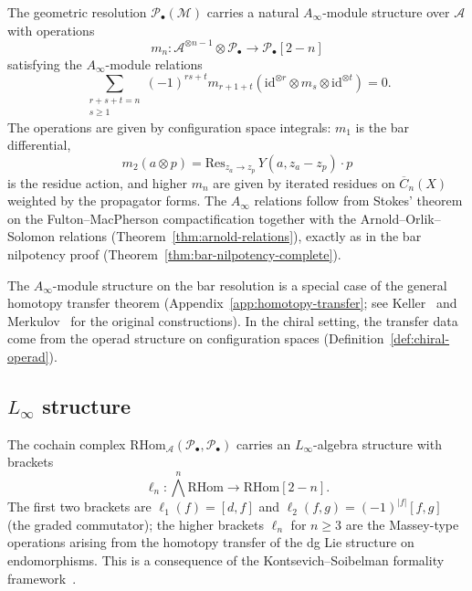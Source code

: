 \begin{theorem}\label{thm:ainfty-module}
The geometric resolution $\mathcal{P}_\bullet(\mathcal{M})$ carries a
natural $A_\infty$-module structure over $\mathcal{A}$ with operations
\[
m_n: \mathcal{A}^{\otimes n-1} \otimes \mathcal{P}_\bullet
\to \mathcal{P}_\bullet[2-n]
\]
satisfying the $A_\infty$-module relations
\[
\sum_{\substack{r+s+t=n \\ s \geq 1}} (-1)^{rs+t}
m_{r+1+t}(\mathrm{id}^{\otimes r} \otimes m_s \otimes \mathrm{id}^{\otimes t}) = 0.
\]
The operations are given by configuration space integrals:
$m_1$ is the bar differential,
\[
m_2(a \otimes p) =
\mathrm{Res}_{z_a \to z_p}\, Y(a, z_a{-}z_p) \cdot p
\]
is the residue action, and higher $m_n$ are given by
iterated residues on $\overline{C}_n(X)$ weighted by the
propagator forms. The $A_\infty$ relations follow from
Stokes' theorem on the Fulton--MacPherson compactification
together with the Arnold--Orlik--Solomon relations
(Theorem~\ref{thm:arnold-relations}), exactly as in the
bar nilpotency proof (Theorem~\ref{thm:bar-nilpotency-complete}).
\end{theorem}

\begin{remark}
The $A_\infty$-module structure on the bar resolution is a special case
of the general homotopy transfer theorem
(Appendix~\ref{app:homotopy-transfer}; see
Keller~\cite{Keller01} and Merkulov~\cite{Merkulov99} for the
original constructions). In the chiral setting, the transfer
data come from the operad structure on configuration spaces
(Definition~\ref{def:chiral-operad}).
\end{remark}

\subsection{\texorpdfstring{$L_\infty$ structure}{L-infinity structure}}

\begin{theorem}\label{thm:linfty-cochains}
The cochain complex $\mathrm{RHom}_{\mathcal{A}}(\mathcal{P}_\bullet,
\mathcal{P}_\bullet)$ carries an $L_\infty$-algebra structure with brackets
\[
\ell_n: \textstyle\bigwedge^n \mathrm{RHom} \to \mathrm{RHom}[2-n].
\]
The first two brackets are $\ell_1(f) = [d, f]$ and
$\ell_2(f, g) = (-1)^{|f|}[f, g]$ (the graded commutator);
the higher brackets $\ell_n$ for $n \geq 3$ are
the Massey-type operations arising from the homotopy
transfer of the dg Lie structure on endomorphisms.
This is a consequence of the Kontsevich--Soibelman formality
framework~\cite{KontsevichSoibelman}.
\end{theorem}

